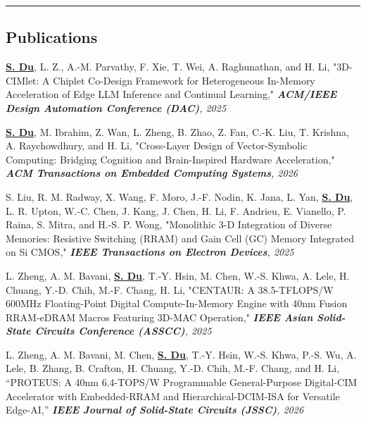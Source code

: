 \documentclass[10.5pt,letterpaper]{article}
\begin{document}
\hrule
\vspace{-1em}
\subsection*{\Large Publications}
\begin{enumerate}[leftmargin=2em, noitemsep, label={[\arabic*]}]
	   \item \textbf{\underline{S. Du}}, L. Z., A.-M. Parvathy, F. Xie, T. Wei, A. Raghunathan, and H. Li, "3D-CIMlet: A Chiplet Co-Design Framework for Heterogeneous In-Memory Acceleration of Edge LLM Inference and Continual Learning," \textit{\textbf{ACM/IEEE Design Automation Conference (DAC)}, 2025}

       \item \textbf{\underline{S. Du}}, M. Ibrahim, Z. Wan, L. Zheng, B. Zhao, Z. Fan, C.-K. Liu, T. Krishna, A. Raychowdhury, and H. Li, "Cross-Layer Design of Vector-Symbolic Computing: Bridging Cognition and Brain-Inspired Hardware Acceleration," \textit{\textbf{ACM Transactions on Embedded Computing Systems}, 2026}
       
       \item S. Liu, R. M. Radway, X. Wang, F. Moro, J.-F. Nodin, K. Jana, L. Yan, \textbf{\underline{S. Du}}, L. R. Upton, W.-C. Chen, J. Kang, J. Chen, H. Li, F. Andrieu, E. Vianello, P. Raina, S. Mitra, and H.-S. P. Wong, "Monolithic 3-D Integration of Diverse Memories: Resistive Switching (RRAM) and Gain Cell (GC) Memory Integrated on Si CMOS," \textit{\textbf{IEEE Transactions on Electron Devices}, 2025}

       \item L. Zheng, A. M. Bavani, \textbf{\underline{S. Du}}, T.-Y. Hsin, M. Chen, W.-S. Khwa, A. Lele, H. Chuang, Y.-D. Chih, M.-F. Chang, H. Li, "CENTAUR: A 38.5-TFLOPS/W 600MHz Floating-Point Digital Compute-In-Memory Engine with 40nm Fusion RRAM-eDRAM Macros Featuring 3D-MAC Operation," \textit{\textbf{IEEE Asian Solid-State Circuits Conference (ASSCC)}, 2025}
       
       \item L. Zheng, A. M. Bavani, M. Chen, \textbf{\underline{S. Du}}, T.-Y. Hsin, W.-S. Khwa, P.-S. Wu, A. Lele, B. Zhang, B. Crafton, H. Chuang, Y.-D. Chih, M.-F. Chang, and H. Li, “PROTEUS: A 40nm 6.4-TOPS/W Programmable General-Purpose Digital-CIM Accelerator with Embedded-RRAM and Hierarchical-DCIM-ISA for Versatile Edge-AI,” \textit{\textbf{IEEE Journal of Solid-State Circuits (JSSC)}, 2026}


\end{enumerate}
\end{document}
